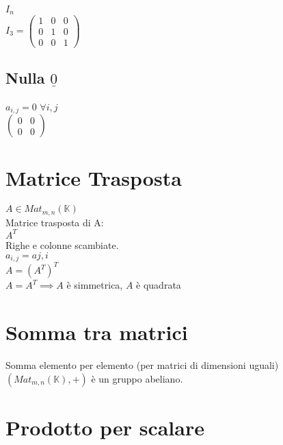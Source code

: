 \documentclass[a4paper, twoside, italian, 11pt]{book}
\newcommand{\K}{\mathbb K}
\begin{document}
\noindent
$I_n$ \\

\noindent
$I_3 = \begin{pmatrix}
1 & 0 & 0 \\
0 & 1 & 0 \\
0 & 0 & 1
\end{pmatrix}$


\subsection{Nulla $\underline{0}$}

$a_{i,j} = 0$ $\forall i, j$ \\

\noindent
$\begin{pmatrix}
0 & 0 \\
0 & 0
\end{pmatrix}$



\section{Matrice Trasposta}

$A \in Mat_{m,n}(\K)$ \\

\noindent
Matrice trasposta di A: \\
$A^T$ \\

\noindent
Righe e colonne scambiate. \\
$a_{i,j} = a{j,i}$ \\

\noindent
$A = (A^T)^T$ \\

\noindent
$A = A^T \implies A$ è simmetrica, $A$ è quadrata



\section{Somma tra matrici}

Somma elemento per elemento (per matrici di dimensioni uguali) \\

\noindent
$(Mat_{m,n}(\K), +)$ è un gruppo abeliano.



\section{Prodotto per scalare}
\end{document}
